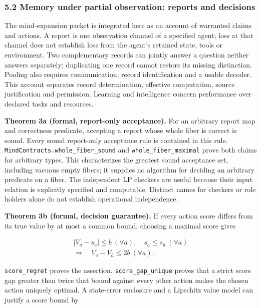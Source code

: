 \documentclass[
  10pt,
]{article}
\begin{document}
\subsubsection{5.2 Memory under partial observation: reports and decisions}\label{memory-under-partial-observation-reports-and-decisions}

The mind-expansion packet is integrated here as an account of warranted claims and actions. A report is one observation channel of a specified agent; loss at that channel does not establish loss from the agent's retained state, tools or environment. Two complementary records can jointly answer a question neither answers separately; duplicating one record cannot restore its missing distinction. Pooling also requires communication, record identification and a usable decoder. This account separates record determination, effective computation, source justification and permission. Learning and intelligence concern performance over declared tasks and resources.

\textbf{Theorem 3a (formal, report-only acceptance).} For an arbitrary report map and correctness predicate, accepting a report whose whole fiber is correct is sound. Every sound report-only acceptance rule is contained in this rule. \texttt{MindContracts.whole\_fiber\_sound} and \texttt{whole\_fiber\_maximal} prove both claims for arbitrary types. This characterizes the greatest sound acceptance set, including vacuous empty fibers; it supplies no algorithm for deciding an arbitrary predicate on a fiber. The independent LP checkers are useful because their input relation is explicitly specified and computable. Distinct names for checkers or role holders alone do not establish operational independence.

\textbf{Theorem 3b (formal, decision guarantee).} If every action score differs from its true value by at most a common bound, choosing a maximal score gives

\protect\hypertarget{math-E0041-0044}{}{\[
\begin{gathered}
|V_a-s_a|\le b\ (\forall a),\quad s_a\le s_{\widehat a}\ (\forall a)\\
\Longrightarrow\quad V_a-V_{\widehat a}\le2b\ (\forall a).
\end{gathered}
\]}

\texttt{score\_regret} proves the assertion. \texttt{score\_gap\_unique} proves that a strict score gap greater than twice that bound against every other action makes the chosen action uniquely optimal. A state-error enclosure and a Lipschitz value model can justify a score bound by
\end{document}
